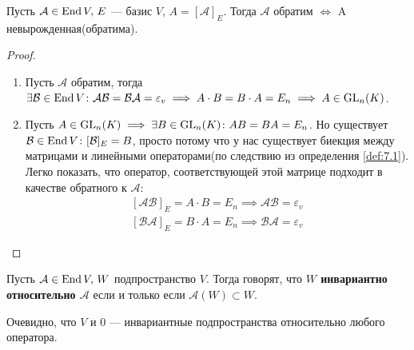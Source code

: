 \documentclass[../main.tex]{subfiles}
\begin{document}
\begin{theorem-non}
\label{non:7.6}
  Пусть $\mathcal{A} \in \operatorname{End} V,\, E$ --- базис $V,\, A = [\mathcal{A}]_E$.
  Тогда $\mathcal{A}$ обратим $\iff$ A невырожденная(обратима).
\end{theorem-non}
\begin{proof}
  \begin{enumerate}
    \item Пусть $\mathcal{A}$ обратим, тогда $\exists \mathcal{B} \in \operatorname{End} V\colon \mathcal{AB} = \mathcal{BA} = \varepsilon_v \implies A \cdot B = B \cdot A = E_n \implies A \in \operatorname{GL}_n(K)$.
    \item Пусть $A \in \operatorname{GL}_n(K) \implies \exists B \in \operatorname{GL}_n(K)\colon AB = BA = E_n$. Но существует $\mathcal{B} \in \operatorname{End} V\colon [\mathcal{B}]_E = B$, просто потому что у нас существует биекция между матрицами и линейными операторами(по следствию из определения \ref{def:7.1}). Легко показать, что оператор, соответствующей этой матрице подходит в качестве обратного к $\mathcal{A}$:
    $$
      \begin{gathered}
        [\mathcal{AB}]_E = A \cdot B = E_n \implies \mathcal{AB} = \varepsilon_v \\
        [\mathcal{BA}]_E = B \cdot A = E_n \implies \mathcal{BA} = \varepsilon_v
      \end{gathered}
    $$
  \end{enumerate}
\end{proof}

\begin{definition}
  Пусть $\mathcal{A} \in \operatorname{End} V,\, W$ подпространство $V$. Тогда говорят, что \textbf{$W$ инвариантно относительно $\mathcal{A}$} если и только если $\mathcal{A}(W) \subset W$.
\end{definition}
\begin{remark}
  Очевидно, что $V$ и $0$ --- инвариантные подпространства относительно любого оператора.
\end{remark}
\end{document}
